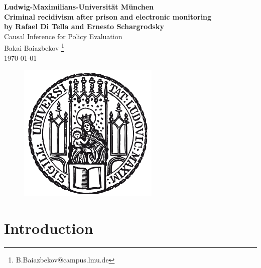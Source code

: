 \documentclass[a4paper,12pt]{article}
\begin{document}
\begin{titlepage}
\begin{center}
		{\Large \textbf{Ludwig-Maximilians-Universität München}} \\
	\vspace{35mm}
{\bfseries\LARGE{Criminal recidivism after prison and electronic monitoring}} \\{\bfseries\large{by Rafael Di Tella and Ernesto Schargrodsky}} 
			\vspace{10mm}\\
            {\Large Causal Inference for Policy Evaluation } \\
			\vspace{2mm}
            {\Large{Bakai Baiazbekov
		\renewcommand\thefootnote{*}\footnote{B.Baiazbekov@campus.lmu.de}}}\\
        {\today}	\\
		\vspace{8mm}
		\begin{figure}[h] 
        \begin{center}
\includegraphics[width=0.6\textwidth]{lmu_siegel.png} \
\end{center}
\end{figure}%
	\end{center}

\end{titlepage}


\setcounter{page}{2}
\tableofcontents  
\newpage

\setcounter{page}{1}


\section{Introduction}
\end{document}
